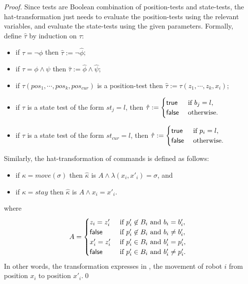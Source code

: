 \begin{proof}
Since tests are Boolean combination of position-tests and state-tests, the hat-transformation just needs to evaluate the position-tests using the relevant variables, and evaluate the state-tests using the given parameters. Formally, define $\hat{\tau}$ by induction on $\tau$:
\begin{itemize}
 \item if $\tau = \neg \phi$ then $\hat{\tau} := \neg \hat{\phi}$;
 \item if $\tau = \phi \wedge \psi$ then $\hat{\tau} := \hat{\phi} \wedge \hat{\psi}$;
 \item if $\tau(pos_1,\cdots,pos_k,pos_{cur})$ is a position-test then $\hat{\tau} := \tau(z_1,\cdots,z_k,x_i)$;
 \item if $\tau$ is a state test of the form $st_j = l$, then 
 $\hat{\tau} := \begin{cases}
                 \mathsf{true} & \mbox{ if } b_j = l,\\
                 \mathsf{false} & \mbox{ otherwise.}
                \end{cases}
 $
 \item  if $\tau$ is a state test of the form $st_{cur} = l$, then 
 $\hat{\tau} := \begin{cases}
                 \mathsf{true} & \mbox{ if } p_i = l,\\
                 \mathsf{false} & \mbox{ otherwise.}
                \end{cases}
                $
\end{itemize}              
    
Similarly, the hat-transformation of commands is defined as follows:
\begin{itemize}
  \item if $\kappa = move(\sigma)$ then $\hat{\kappa}$ is $A \wedge \lambda(x_i,x'_i) = \sigma$, and 
  \item if $\kappa = stay$ then $\hat{\kappa}$ is $A \wedge x_i = x'_i$.
\end{itemize}
where 
\[ A = \begin{cases}
	      z_i = z'_i 	& 	\mbox{ if } p'_i \not \in B_i \mbox{ and } b_i = b'_i,\\
	      \mathsf{false} 		& 	\mbox{ if } p'_i \not \in B_i \mbox{ and } b_i \neq b'_i,\\
	      x'_i = z'_i 	& 	\mbox{ if } p'_i \in B_i \mbox{ and } b'_i = p'_i,\\
	      \mathsf{false} 		& 	\mbox{ if } p'_i \in B_i \mbox{ and } b'_i \neq p'_i.
	  \end{cases}
\] 
In other words, the transformation expresses in \msol, the movement of robot $i$ from position $x_i$ to position $x'_i$.\qed 
\end{proof}

